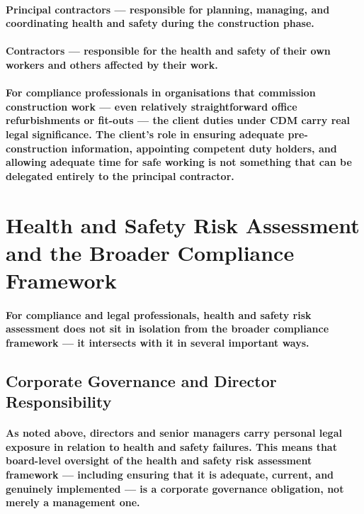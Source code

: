 \paragraph{\textbf{Principal contractors} — responsible for planning, managing, and coordinating health and safety during the construction phase.}
\paragraph{\textbf{Contractors} — responsible for the health and safety of their own workers and others affected by their work.}
\paragraph{For compliance professionals in organisations that commission construction work — even relatively straightforward office refurbishments or fit-outs — the client duties under CDM carry real legal significance. The client's role in ensuring adequate pre-construction information, appointing competent duty holders, and allowing adequate time for safe working is not something that can be delegated entirely to the principal contractor.}

\section{Health and Safety Risk Assessment and the Broader Compliance Framework}
\paragraph{For compliance and legal professionals, health and safety risk assessment does not sit in isolation from the broader compliance framework — it intersects with it in several important ways.}

\subsection{Corporate Governance and Director Responsibility}
\paragraph{As noted above, directors and senior managers carry personal legal exposure in relation to health and safety failures. This means that board-level oversight of the health and safety risk assessment framework — including ensuring that it is adequate, current, and genuinely implemented — is a corporate governance obligation, not merely a management one.}
